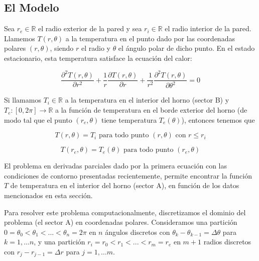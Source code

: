 \documentclass[11pt, a4paper, spanish]{article}
\theoremstyle{plain}
\theoremstyle{remark}
\begin{document}
\begin{appendices}
    \subsection{El Modelo}

      Sea $r_e \in \mathbb{R}$ el radio exterior de la pared y sea $r_i \in \mathbb{R}$ el radio interior de la pared. Llamemos $T(r, \theta)$ a la temperatura en el punto dado por las coordenadas polares $(r, \theta)$, siendo $r$ el radio y $\theta$ el ángulo polar de dicho punto. En el estado estacionario, esta temperatura satisface la ecuación del calor:

      \begin{equation} \label{eq:en1}
        \frac{\partial^2 T(r, \theta)}{\partial r^2} + \frac{1}{r} \frac{\partial T(r, \theta)}{\partial r} + \frac{1}{r^2} \frac{\partial^2 T(r, \theta)}{\partial \theta^2} = 0
      \end{equation}

      Si llamamos $T_i \in \mathbb{R}$ a la temperatura en el interior del horno (sector B) y $T_e : [0, 2\pi] \to \mathbb{R}$ a la función de temperatura en el borde exterior del horno (de modo tal que el punto $(r_e, \theta)$ tiene temperatura $T_e(\theta)$), entonces tenemos que

      \begin{equation} \label{eq:en2}
        T(r, \theta) = T_i \text{ para todo punto } (r, \theta) \text{ con } r \leq r_i
      \end{equation}

      \begin{equation} \label{eq:en3}
        T(r_e, \theta) = T_e(\theta) \text{ para todo punto } (r_e, \theta)
      \end{equation}

      El problema en derivadas parciales dado por la primera ecuación con las condiciones de contorno presentadas recientemente, permite encontrar la función $T$ de temperatura en el interior del horno (sector A), en función de los datos mencionados en esta sección.

      Para resolver este problema computacionalmente, discretizamos el dominio del problema (el sector A) en coordenadas polares. Consideramos una partición $0 = \theta_0 < \theta_1 < ... < \theta_n = 2\pi$ en $n$ ángulos discretos con $\theta_k - \theta_{k-1} = \Delta \theta$ para $k = 1, \dots n$, y una partición $r_i = r_0 < r_1 < ... < r_m = r_e$ en $m + 1$ radios discretos con $r_j - r_{j-1} = \Delta r$ para $j = 1, \dots m$.


\end{appendices}
\end{document}
